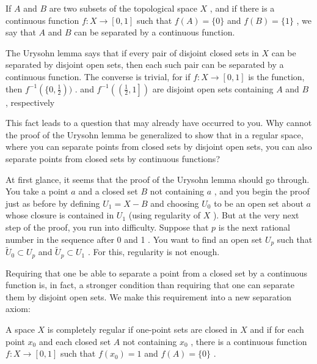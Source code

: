 \begin{definition}
	If \(A\) and \(B\) are two subsets of the topological space \(X\) , and if there is a continuous function \(f : X \rightarrow  \left\lbrack  {0,1}\right\rbrack\) such that \(f\left( A\right)  = \{ 0\}\) and \(f\left( B\right)  = \{ 1\}\) , we say that \(A\) and \(B\) can be separated by a continuous function.
\end{definition}

The Urysohn lemma says that if every pair of disjoint closed sets in \(X\) can be separated by disjoint open sets, then each such pair can be separated by a continuous function. The converse is trivial, for if \(f : X \rightarrow  \left\lbrack  {0,1}\right\rbrack\) is the function, then \({f}^{-1}\left( {\{ 0,\frac{1}{2}}\right) )\) . and \({f}^{-1}\left( \left( {\frac{1}{2},1}\right\rbrack  \right)\) are disjoint open sets containing \(A\) and \(B\) , respectively

This fact leads to a question that may already have occurred to you. Why cannot the proof of the Urysohn lemma be generalized to show that in a regular space, where you can separate points from closed sets by disjoint open sets, you can also separate points from closed sets by continuous functions?

At first glance, it seems that the proof of the Urysohn lemma should go through. You take a point \(a\) and a closed set \(B\) not containing \(a\) , and you begin the proof just as before by defining \({U}_{1} = X - B\) and choosing \({U}_{0}\) to be an open set about \(a\) whose closure is contained in \({U}_{1}\) (using regularity of \(X\) ). But at the very next step of the proof, you run into difficulty. Suppose that \(p\) is the next rational number in the sequence after 0 and 1 . You want to find an open set \({U}_{p}\) such that \({\widetilde{U}}_{0} \subset  {U}_{p}\) and \({\widetilde{U}}_{p} \subset  {U}_{1}\) . For this, regularity is not enough.

Requiring that one be able to separate a point from a closed set by a continuous function is, in fact, a stronger condition than requiring that one can separate them by disjoint open sets. We make this requirement into a new separation axiom:

\begin{definition}
	A space \(X\) is completely regular if one-point sets are closed in \(X\) and if for each point \({x}_{0}\) and each closed set \(A\) not containing \({x}_{0}\) , there is a continuous function \(f : X \rightarrow  \left\lbrack  {0,1}\right\rbrack\) such that \(f\left( {x}_{0}\right)  = 1\) and \(f\left( A\right)  = \{ 0\}\) .
\end{definition}

